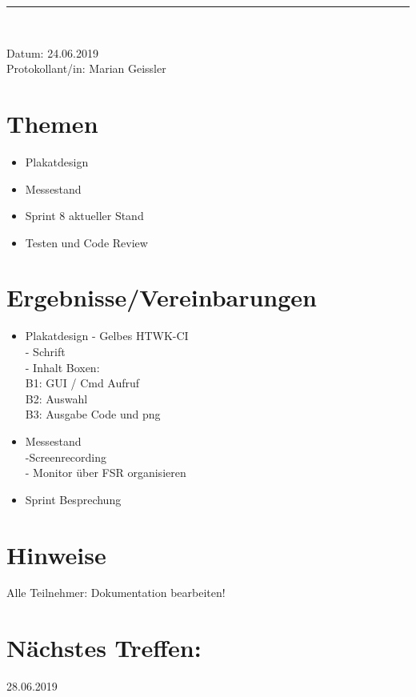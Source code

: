 \begin{center}  
\vspace{0.5pt}\nointerlineskip\rule{\textwidth}{0.2pt}\\ 
\vspace{0.5pt}\nointerlineskip
\end{center} 
\large Datum: 24.06.2019\vspace{3pt}\\\large Protokollant/in: Marian Geissler
\section*{Themen}
\begin{itemize}
\item Plakatdesign\\
\item Messestand\\
\item Sprint 8 aktueller Stand\\
\item Testen und Code Review\\
\end{itemize}
\section*{Ergebnisse/Vereinbarungen}
\begin{itemize}
\item Plakatdesign
- Gelbes HTWK-CI \\
- Schrift\\
- Inhalt Boxen: \\
B1: GUI / Cmd Aufruf\\
B2: Auswahl\\
B3: Ausgabe Code und png\\
\item Messestand\\
-Screenrecording\\
- Monitor über FSR organisieren\\
\item Sprint Besprechung \\

\end{itemize}
\section*{Hinweise}
Alle Teilnehmer: Dokumentation bearbeiten!
\section*{Nächstes Treffen:}
28.06.2019
